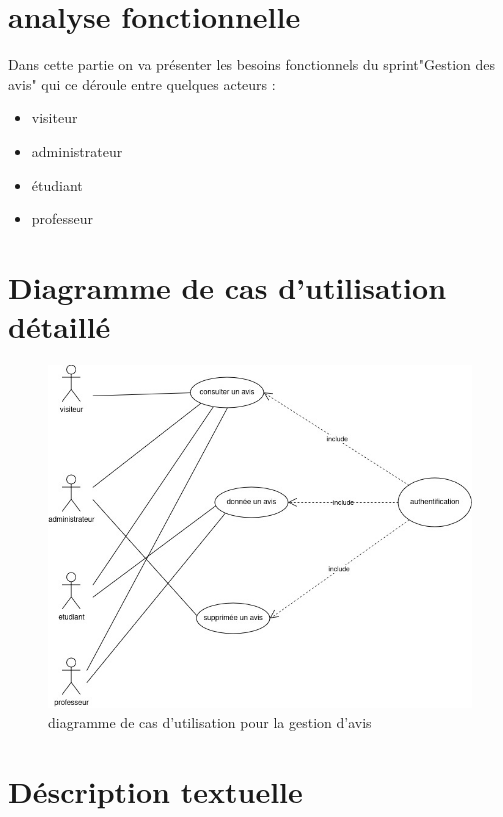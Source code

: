 \section{analyse fonctionnelle}
Dans cette partie on va présenter les besoins fonctionnels du sprint"Gestion des avis"  qui ce déroule entre quelques acteurs : 
\begin{itemize}
    \item visiteur 
    \item administrateur 
    \item étudiant
    \item professeur 
\end{itemize}
\section{Diagramme de cas d'utilisation détaillé }

\begin{figure}[h]
    \centering
    \includegraphics[width=0.7\linewidth]{pages/image/asma-usecase-gestion_des_avis.jpg}
    \caption{ diagramme de cas d'utilisation pour la gestion d'avis}
    \label{fig:enter-label}
\end{figure}
\newpage
\section{Déscription textuelle }

